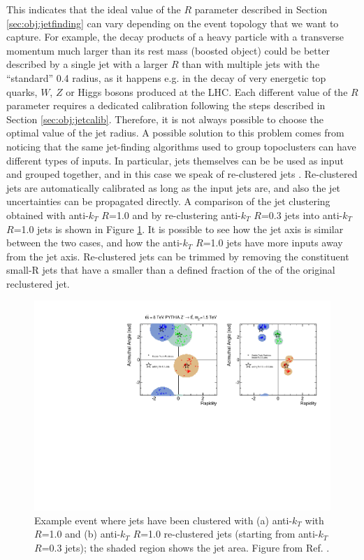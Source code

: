 This indicates that the ideal value of the $R$ parameter described in Section \ref{sec:obj:jetfinding} can vary depending on the event topology that we want to capture. 
For example, the decay products of a heavy particle with a transverse momentum much larger than its rest mass (boosted object) could be better described by a 
single jet with a larger $R$ than with multiple jets with the ``standard'' 0.4 radius, 
as it happens e.g. in the decay of very energetic top quarks, $W$, $Z$ or Higgs bosons produced at the LHC.
Each different value of the $R$ parameter requires a dedicated calibration following the steps described in Section \ref{sec:obj:jetcalib}. 
Therefore, it is not always possible to choose the optimal value of the jet radius. 
A possible solution to this problem comes from noticing that the same jet-finding algorithms used to group topoclusters can have different types of inputs. 
In particular, jets themselves can be be used as input and grouped together, and in this case we speak of re-clustered jets \cite{Nachman:2014kla}. 
Re-clustered jets are automatically calibrated as long as the input jets are, and also the jet uncertainties can be propagated directly. 
A comparison of the jet clustering obtained with anti-$k_T$ $R$=1.0 and by re-clustering anti-$k_T$ $R$=0.3 jets into anti-$k_T$ $R$=1.0 jets 
is shown in Figure \ref{fig:recluster}. It is possible to see how the jet axis is similar between the two cases, and how the anti-$k_T$ $R$=1.0 jets have more inputs away from the jet axis.
Re-clustered jets can be trimmed by removing the constituent small-R jets that have a \pt smaller than a defined fraction of the \pt of the original reclustered jet. 


\begin{figure}[h]
\begin{center}
\includegraphics[width=1.0\textwidth]{./figures/objects/reclustered.pdf}
\end{center}
\caption{Example event where jets have been clustered with (a) anti-$k_T$ with $R$=1.0 and (b) anti-$k_T$ $R$=1.0 re-clustered jets (starting from anti-$k_T$ $R$=0.3 jets); the shaded region shows the jet area. Figure from Ref. \cite{Nachman:2014kla}.}
\label{fig:recluster}
\end{figure}

